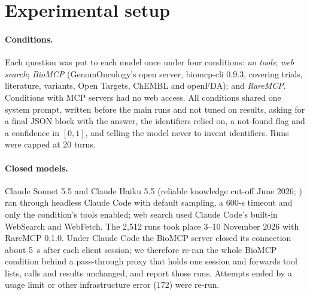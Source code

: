 \documentclass[11pt]{article}
\begin{document}
\section{Experimental setup}
\label{sec:setup}

\paragraph{Conditions.} Each question was put to each model once under four conditions: \emph{no tools}; \emph{web search}; \emph{BioMCP} (GenomOncology's open server, biomcp-cli 0.9.3, covering trials, literature, variants, Open Targets, ChEMBL and openFDA); and \emph{RareMCP}. Conditions with MCP servers had no web access. All conditions shared one system prompt, written before the main runs and not tuned on results, asking for a final JSON block with the answer, the identifiers relied on, a not-found flag and a confidence in $[0,1]$, and telling the model never to invent identifiers. Runs were capped at 20 turns.

\paragraph{Closed models.} Claude Sonnet 5.5 and Claude Haiku 5.5 (reliable knowledge cut-off June 2026; \citealp{claude55}) ran through headless Claude Code \citep{claudecode} with default sampling, a 600-s timeout and only the condition's tools enabled; web search used Claude Code's built-in WebSearch and WebFetch. The 2,512 runs took place 3--10 November 2026 with RareMCP 0.1.0. Under Claude Code the BioMCP server closed its connection about 5~s after each client session; we therefore re-ran the whole BioMCP condition behind a pass-through proxy that holds one session and forwards tool lists, calls and results unchanged, and report those runs. Attempts ended by a usage limit or other infrastructure error (172) were re-run.
\end{document}
